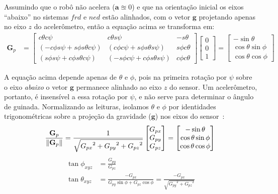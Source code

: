 Assumindo que o robô não acelera (\(\mathbf{a}\approxeq0\)) e que na orientação inicial os eixos ``abaixo'' no sistemas \(frd\) e \(ned\) estão alinhados, com o vetor \(\mathbf{g}\) projetando apenas no eixo \(z\) do acelerômetro, então a equação acima se transforma em:
\begin{align*}
    {\mathbf{G}}_p &= \begin{bmatrix}
        c\theta c\psi   & c\theta s\psi & -s\theta    \\
        \left(-c\phi s\psi + s\phi s\theta c\psi \right)
        &  \left( c\phi c\psi + s\phi s\theta s\psi \right)
        &  s\phi c\theta                                 \\
        \left( s\phi s\psi + c\phi s\theta c\psi \right)
        &  \left( -s\phi c\psi + c\phi s\theta s\psi \right)
        & c\phi c\theta
    \end{bmatrix} \begin{bmatrix} 0 \\ 0 \\ 1 \end{bmatrix} = \begin{bmatrix} -\sin{\theta} \\ \cos{\theta}\sin{\phi} \\ \cos{\theta}\cos{\phi} \end{bmatrix}
\end{align*}

A equação acima depende apenas de \(\theta\) e \(\phi\), pois na primeira rotação por \(\psi\) sobre o eixo \emph{abaixo} o vetor \(\mathbf{g}\) permanece alinhado ao eixo \(z\) do sensor. Um acelerômetro, portanto, é insensível a essa rotação por \(\psi\), e não serve para determinar o ângulo de guinada\footnotemark{}. Normalizando as leituras, isolamos \(\theta\) e \(\phi\) por identidades trigonométricas sobre a projeção da gravidade (\(\mathbf{g}\)) nos eixos do sensor~\cite{freescaleAN3461}:
\begin{equation*}
    \frac{{\mathbf{G}}_{p}}{\lVert{{\mathbf{G}}_{p}}\rVert} =
    \frac{1}{\sqrt{{{{G}_{px}}^{2}} + {{{G}_{py}}^{2}} + {{G}_{pz}}^{2}}} \begin{bmatrix} {G}_{px} \\ {G}_{py} \\ {G}_{pz} \end{bmatrix}
    = \begin{bmatrix} -\sin{\theta} \\ \cos{\theta}\sin{\phi} \\ \cos{\theta}\cos{\phi} \end{bmatrix} \\
\end{equation*}
\begin{align*}
    \tan{\phi}_{xyz} &= \frac{G_{py}}{G_{pz}} \\
    \tan{\theta}_{xyz} &= \frac{-G_{px}}{{G_{py}\sin{\phi}}+{{{G}_{pz}}\cos{\phi}}} = \frac{-G_{px}}{\sqrt{{{G_{py}}^{2}}+{{{G}_{pz}}^2}}}
\end{align*}

